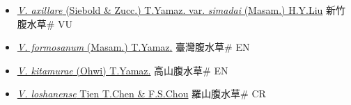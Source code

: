 \begin{itemize}
  \begin{itemize}
        \item[] \href{http://www.theplantlist.org/tpl1.1/search?q=Veronicastrum+axillare+var.+simadai}{\textit{V. axillare} (Siebold \& Zucc.) T.Yamaz. var. \textit{simadai} (Masam.) H.Y.Liu}   新竹腹水草\# VU
        \item[] \href{http://www.theplantlist.org/tpl1.1/search?q=Veronicastrum+formosanum}{\textit{V. formosanum} (Masam.) T.Yamaz.}   臺灣腹水草\# EN
        \item[] \href{http://www.theplantlist.org/tpl1.1/search?q=Veronicastrum+kitamurae}{\textit{V. kitamurae} (Ohwi) T.Yamaz.}   高山腹水草\# EN
        \item[] \href{http://www.theplantlist.org/tpl1.1/search?q=Veronicastrum+loshanense}{\textit{V. loshanense} Tien T.Chen \& F.S.Chou}   羅山腹水草\# CR
  \end{itemize}
  \end{itemize}
